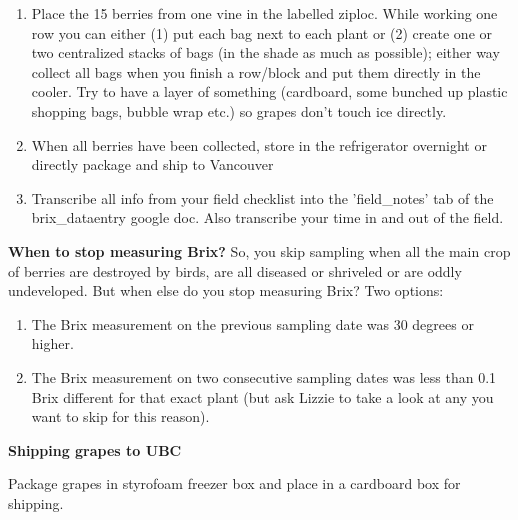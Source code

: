\documentclass[11pt,letter]{article}
\begin{document}
\begin{enumerate}
\item Place the 15 berries from one vine in the labelled ziploc. While working one row you can either (1) put each bag next to each plant or (2) create one or two centralized stacks of bags (in the shade as much as possible); either way collect all bags when you finish a row/block and put them directly in the cooler. Try to have a layer of something (cardboard, some bunched up plastic shopping bags, bubble wrap etc.) so grapes don’t touch ice directly. 

\item When all berries have been collected, store in the refrigerator overnight or directly package and ship to Vancouver %


\item Transcribe all info from your field checklist into the 'field\_notes' tab of the brix\_dataentry google doc. Also transcribe your time in and out of the field. 

\end{enumerate}

{\bf When to stop measuring Brix?}
So, you skip sampling when all the main crop of berries are destroyed by birds, are all diseased or shriveled or are oddly undeveloped. But when else do you stop measuring Brix? Two options:
\begin{enumerate}
\item The Brix measurement on the previous sampling date was 30 degrees or higher.
\item The Brix measurement on two consecutive sampling dates was less than 0.1 Brix different for that exact plant (but ask Lizzie to take a look at any you want to skip for this reason).
\end{enumerate}

{\bf Shipping grapes to UBC}

Package grapes in styrofoam freezer box and place in a cardboard box for shipping. \\ %
\end{document}
